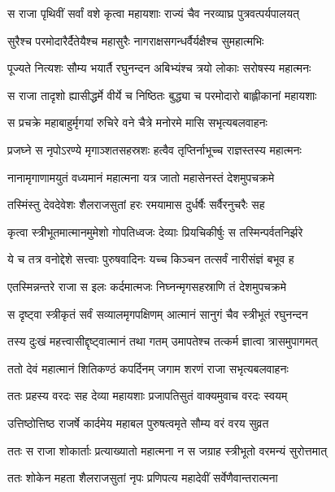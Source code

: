 \twolineshloka
{स राजा पृथिवीं सर्वां वशे कृत्वा महायशाः}
{राज्यं चैव नरव्याघ्र पुत्रवत्पर्यपालयत्} %

\twolineshloka
{सुरैश्च परमोदारैर्दैतेयैश्च महासुरैः}
{नागराक्षसगन्धर्वैर्यक्षैश्च सुमहात्मभिः} %

\twolineshloka
{पूज्यते नित्यशः सौम्य भयार्तै रघुनन्दन}
{अबिभ्यंश्च त्रयो लोकाः सरोषस्य महात्मनः} %

\twolineshloka
{स राजा तादृशो ह्यासीद्धर्मे वीर्ये च निष्ठितः}
{बुद्ध्या च परमोदारो बाह्लीकानां महायशाः} %

\twolineshloka
{स प्रचक्रे महाबाहुर्मृगयां रुचिरे वने}
{चैत्रे मनोरमे मासि सभृत्यबलवाहनः} %

\twolineshloka
{प्रजघ्ने स नृपोऽरण्ये मृगाञ्शतसहस्रशः}
{हत्वैव तृप्तिर्नाभूच्च राज्ञस्तस्य महात्मनः} %

\twolineshloka
{नानामृगाणामयुतं वध्यमानं महात्मना}
{यत्र जातो महासेनस्तं देशमुपचक्रमे} %

\twolineshloka
{तस्मिंस्तु देवदेवेशः शैलराजसुतां हरः}
{रमयामास दुर्धर्षैः सर्वैरनुचरैः सह} %

\twolineshloka
{कृत्वा स्त्रीभूतमात्मानमुमेशो गोपतिध्वजः}
{देव्याः प्रियचिकीर्षुः स तस्मिन्पर्वतनिर्झरे} %

\twolineshloka
{ये च तत्र वनोद्देशे सत्त्वाः पुरुषवादिनः}
{यच्च किञ्चन तत्सर्वं नारीसंज्ञं बभूव ह} %

\twolineshloka
{एतस्मिन्नन्तरे राजा स इलः कर्दमात्मजः}
{निघ्नन्मृगसहस्राणि तं देशमुपचक्रमे} %

\twolineshloka
{स दृष्ट्वा स्त्रीकृतं सर्वं सव्यालमृगपक्षिणम्}
{आत्मानं सानुगं चैव स्त्रीभूतं रघुनन्दन} %

\twolineshloka
{तस्य दुःखं महत्त्वासीद्दृष्ट्वात्मानं तथा गतम्}
{उमापतेश्च तत्कर्म ज्ञात्वा त्रासमुपागमत्} %

\twolineshloka
{ततो देवं महात्मानं शितिकण्ठं कपर्दिनम्}
{जगाम शरणं राजा सभृत्यबलवाहनः} %

\twolineshloka
{ततः प्रहस्य वरदः सह देव्या महायशाः}
{प्रजापतिसुतं वाक्यमुवाच वरदः स्वयम्} %

\twolineshloka
{उत्तिष्ठोत्तिष्ठ राजर्षे कार्दमेय महाबल}
{पुरुषत्वमृते सौम्य वरं वरय सुव्रत} %

\twolineshloka
{ततः स राजा शोकार्ताः प्रत्याख्यातो महात्मना}
{न स जग्राह स्त्रीभूतो वरमन्यं सुरोत्तमात्} %

\twolineshloka
{ततः शोकेन महता शैलराजसुतां नृपः}
{प्रणिपत्य महादेवीं सर्वेणैवान्तरात्मना} %

